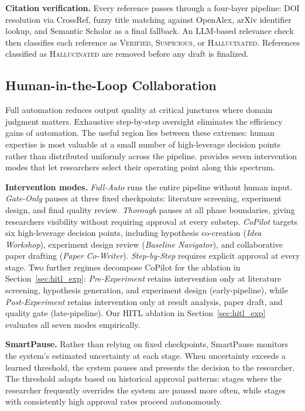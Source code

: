 \noindent \textbf{Citation verification.}
Every reference passes through a four-layer pipeline: DOI resolution via CrossRef, fuzzy title matching against OpenAlex, arXiv identifier lookup, and Semantic Scholar as a final fallback.
An LLM-based relevance check then classifies each reference as \textsc{Verified}, \textsc{Suspicious}, or \textsc{Hallucinated}.
References classified as \textsc{Hallucinated} are removed before any draft is finalized.

\vspace{-0.3em}
\subsection{Human-in-the-Loop Collaboration}
\label{sec:hitl}
\vspace{-0.3em}

Full automation reduces output quality at critical junctures where domain judgment matters.
Exhaustive step-by-step oversight eliminates the efficiency gains of automation.
The useful region lies between these extremes: human expertise is most valuable at a small number of high-leverage decision points rather than distributed uniformly across the pipeline.
\system{} provides seven intervention modes that let researchers select their operating point along this spectrum.

\noindent \textbf{Intervention modes.}
\emph{Full-Auto} runs the entire pipeline without human input.
\emph{Gate-Only} pauses at three fixed checkpoints: literature screening, experiment design, and final quality review.
\emph{Thorough} pauses at all phase boundaries, giving researchers visibility without requiring approval at every substep.
\emph{CoPilot} targets six high-leverage decision points, including hypothesis co-creation (\emph{Idea Workshop}), experiment design review (\emph{Baseline Navigator}), and collaborative paper drafting (\emph{Paper Co-Writer}).
\emph{Step-by-Step} requires explicit approval at every stage.
Two further regimes decompose CoPilot for the ablation in Section~\ref{sec:hitl_exp}: \emph{Pre-Experiment} retains intervention only at literature screening, hypothesis generation, and experiment design (early-pipeline), while \emph{Post-Experiment} retains intervention only at result analysis, paper draft, and quality gate (late-pipeline).
Our HITL ablation in Section~\ref{sec:hitl_exp} evaluates all seven modes empirically.

\noindent \textbf{SmartPause.}
Rather than relying on fixed checkpoints, SmartPause monitors the system's estimated uncertainty at each stage.
When uncertainty exceeds a learned threshold, the system pauses and presents the decision to the researcher.
The threshold adapts based on historical approval patterns: stages where the researcher frequently overrides the system are paused more often, while stages with consistently high approval rates proceed autonomously.

